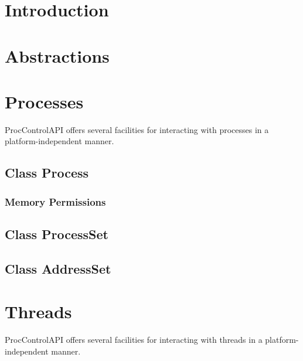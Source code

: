 \documentclass{article}
\begin{document}



\tableofcontents
\clearpage

\setcounter{secnumdepth}{5}

\section{Introduction}
  

\section{Abstractions}
  

\section{Processes}
\label{sec:processes}
  ProcControlAPI offers several facilities for interacting with processes in a
  platform-independent manner.

  \subsection{Class Process}
  \label{subsec:process}
    

    \subsubsection{Memory Permissions}
      

  \subsection{Class ProcessSet}
    

  \subsection{Class AddressSet}
    

\section{Threads}
  ProcControlAPI offers several facilities for interacting with threads in a
  platform-independent manner.
\end{document}
